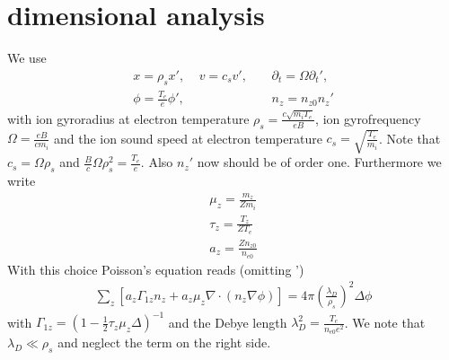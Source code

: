 \documentclass[a4paper,12pt]{scrartcl}
\begin{document}
\section{dimensional analysis}
We use 
\begin{subequations}
    \begin{align}
        x = \rho_s x', \ \ \ \ \  v = c_s v', \ \ \ \ \ 
            &\partial_t = \Omega \partial_t', \\
        \phi = \frac{T_e}{e}\phi',\ \ \ \ \
        &n_z  = n_{z0} n_z'%
        \label{}
    \end{align}
    \label{}
\end{subequations}with 
 ion gyroradius at electron temperature $\rho_s = \frac{c\sqrt{m_i T_e}}{eB}$,
 ion gyrofrequency $\Omega = \frac{eB}{cm_i}$ and
the ion sound speed at electron temperature $c_s = \sqrt{\frac{T_e}{m_i}}$. 
Note that $c_s = \Omega \rho_s$
and $\frac{B}{c}\Omega \rho_s^2 = \frac{T_e}{e}$.
Also $n_z'$ now should be of order one. 
Furthermore we write
\begin{subequations}
    \begin{align}
        \mu_z = \frac{m_z}{Zm_i}\\
        \tau_z = \frac{T_z}{ZT_e} \\
        a_z = \frac{Zn_{z0}}{n_{e0}}
        \label{}
    \end{align}
    \label{}
\end{subequations}
With this choice Poisson's equation reads (omitting ')
\begin{align}
    \sum_z \left[ a_z \Gamma_{1z}n_z + a_z\mu_z\nabla\cdot(n_z \nabla\phi)\right] = 4\pi \left(  \frac{\lambda_D}{\rho_s} \right)^2 \Delta \phi 
    \label{}
\end{align}
with $\Gamma_{1z} = \left(1-\frac{1}{2}\tau_z\mu_z \Delta\right)^{-1}$ and the 
Debye length $\lambda_D^2 = \frac{T_e}{n_{e0}e^2}$. We note 
that $\lambda_D \ll \rho_s$ and neglect the term on the right side.
\end{document}
